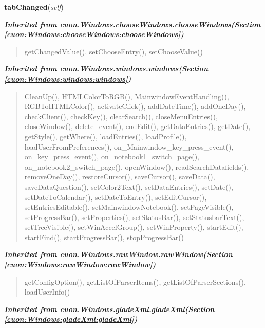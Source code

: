     \vspace{0.5ex}

\hspace{.8\funcindent}\begin{boxedminipage}{\funcwidth}

    \raggedright \textbf{tabChanged}(\textit{self})

\setlength{\parskip}{2ex}
\setlength{\parskip}{1ex}
    \end{boxedminipage}


\large{\textbf{\textit{Inherited from cuon.Windows.chooseWindows.chooseWindows\textit{(Section \ref{cuon:Windows:chooseWindows:chooseWindows})}}}}

\begin{quote}
getChangedValue(), setChooseEntry(), setChooseValue()
\end{quote}

\large{\textbf{\textit{Inherited from cuon.Windows.windows.windows\textit{(Section \ref{cuon:Windows:windows:windows})}}}}

\begin{quote}
CleanUp(), HTMLColorToRGB(), MainwindowEventHandling(), RGBToHTMLColor(), activateClick(), addDateTime(), addOneDay(), checkClient(), checkKey(), clearSearch(), closeMenuEntries(), closeWindow(), delete\_event(), endEdit(), getDataEntries(), getDate(), getStyle(), getWhere(), loadEntries(), loadProfile(), loadUserFromPreferences(), on\_Mainwindow\_key\_press\_event(), on\_key\_press\_event(), on\_notebook1\_switch\_page(), on\_notebook2\_switch\_page(), openWindow(), readSearchDatafields(), removeOneDay(), restoreCursor(), saveCursor(), saveData(), saveDataQuestion(), setColor2Text(), setDataEntries(), setDate(), setDateToCalendar(), setDateToEntry(), setEditCursor(), setEntriesEditable(), setMainwindowNotebook(), setPageVisible(), setProgressBar(), setProperties(), setStatusBar(), setStatusbarText(), setTreeVisible(), setWinAccelGroup(), setWinProperty(), startEdit(), startFind(), startProgressBar(), stopProgressBar()
\end{quote}

\large{\textbf{\textit{Inherited from cuon.Windows.rawWindow.rawWindow\textit{(Section \ref{cuon:Windows:rawWindow:rawWindow})}}}}

\begin{quote}
getConfigOption(), getListOfParserItems(), getListOfParserSections(), loadUserInfo()
\end{quote}

\large{\textbf{\textit{Inherited from cuon.Windows.gladeXml.gladeXml\textit{(Section \ref{cuon:Windows:gladeXml:gladeXml})}}}}

